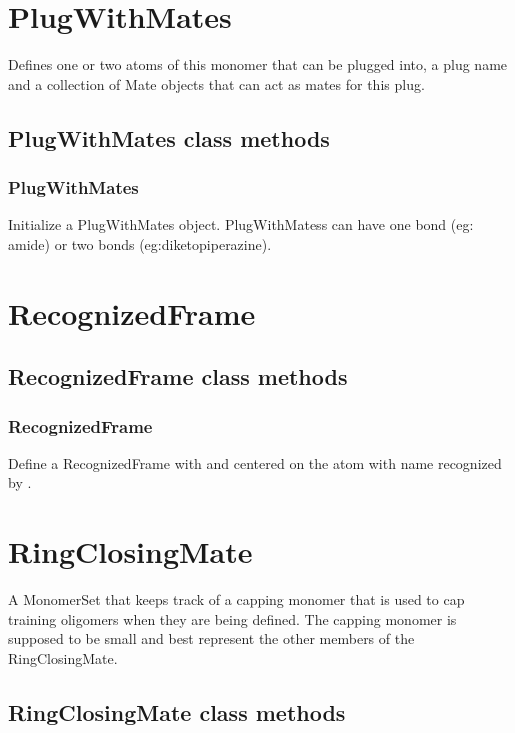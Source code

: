 \begin{itemize}
\section{PlugWithMates}
Defines one or two atoms of this monomer that can be plugged into, a plug name and a
collection of Mate objects that can act as mates for this plug.

\subsection{PlugWithMates class methods}
\subsubsection{PlugWithMates}

Initialize a PlugWithMates object. PlugWithMatess can have one bond (eg: amide) or two bonds (eg:diketopiperazine).

\section{RecognizedFrame}
\subsection{RecognizedFrame class methods}
\subsubsection{RecognizedFrame}

Define a RecognizedFrame with  and centered on the atom with name 
recognized by .


\section{RingClosingMate}
A MonomerSet that keeps track of a capping monomer that is used to cap training oligomers when they are being defined.
The capping monomer is supposed to be small and best represent the other members of the RingClosingMate.

\subsection{RingClosingMate class methods}

\end{itemize}
